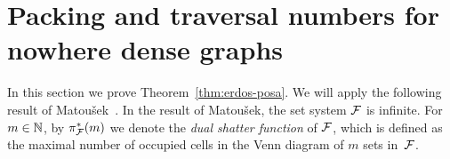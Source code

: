 \section{Packing and traversal numbers for nowhere dense graphs}\label{sec:ep}
In this section we prove 
Theorem~\ref{thm:erdos-posa}. 
%
%
%
We will apply the following result of Matou{\v s}ek~\cite{Matousek:2004:BVI:1005787.1005789}.
In the result of Matou{\v s}ek, the set system $\cal F$ is infinite. For $m\in \N$, by $\pi_{\cal F}^*(m)$ we denote the \emph{dual shatter function} of $\cal F$, which is defined as the maximal number 
of occupied cells in the Venn diagram of $m$ sets in~$\cal F$.



